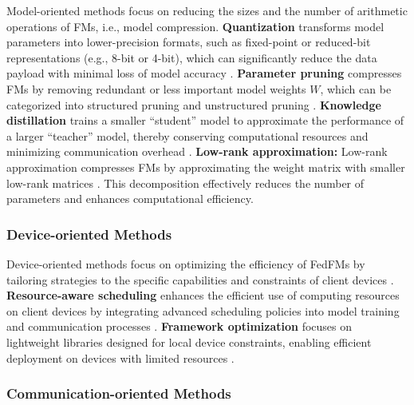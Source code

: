  
Model-oriented methods focus on reducing the sizes and the number of arithmetic operations of FMs, i.e., model compression. \textbf{Quantization} transforms model parameters into lower-precision formats, such as fixed-point or reduced-bit representations (e.g., 8-bit or 4-bit), which can significantly reduce the data payload with minimal loss of model accuracy \cite{ren2023two, cao2024fedmq, mao2022communication}. 
\textbf{Parameter pruning} compresses FMs by removing redundant or less important model weights $W$, which can be categorized into structured pruning and unstructured pruning \cite{fan2024data,huang2024fedmef}.
\textbf{Knowledge distillation} trains a smaller “student” model to approximate the performance of a larger “teacher” model, thereby conserving computational resources and minimizing communication overhead \cite{ li2019fedmd}.
\textbf{Low-rank approximation:} Low-rank approximation compresses FMs by approximating the weight matrix with smaller low-rank matrices \cite{song2024low}.%
This decomposition effectively reduces the number of parameters and enhances computational efficiency.


\subsubsection{Device-oriented Methods}

Device-oriented methods focus on optimizing the efficiency of FedFMs by tailoring strategies to the specific capabilities and constraints of client devices \cite{hou2020dynabert,laskaridis2024melting}.
\textbf{Resource-aware scheduling} enhances the efficient use of computing resources on client devices by integrating advanced scheduling policies into model training and communication processes \cite{hou2020dynabert,luo2021info,luo2022info}. 
\textbf{Framework optimization} focuses on lightweight libraries designed for local device constraints, enabling efficient deployment on devices with limited resources \cite{niu2024smartmem, kwon2023efficient}.

\subsubsection{Communication-oriented Methods}

